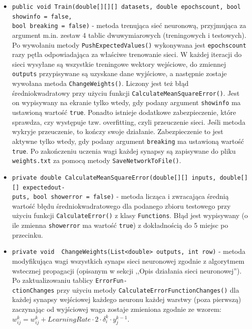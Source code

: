 \documentclass[12pt,a4paper]{article}
\begin{document}
\begin{itemize}
	    \item \lstinline{public void Train(double[][][] datasets, double epochscount, bool showinfo = false,} \\ \lstinline{bool breaking = false)} - metoda trenująca sieć neuronową, przyjmująca za argument m.in. zestaw 4 tablic dwuwymiarowych (treningowych i testowych). Po wywołaniu metody \lstinline{PushExpectedValues()} wykonywana jest \lstinline{epochscount} razy pętla odpowiadająca za właściwe trenowanie sieci. W każdej iteracji do sieci wysyłane są wszystkie treningowe wektory wejściowe, do zmiennej \lstinline{outputs} przypisywane są uzyskane dane wyjściowe, a następnie zostaje wywołana metoda \lstinline{ChangeWeights()}. Liczony jest też błąd średniokwadratowy przy użyciu funkcji \lstinline{CalculateMeanSquareError()}. Jest on wypisywany na ekranie tylko wtedy, gdy podany argument \lstinline{showinfo} ma ustawioną wartość \lstinline{true}. Ponadto istnieje dodatkowe zabezpieczenie, które sprawdza, czy występuje tzw. overfitting, czyli przeuczenie sieci. Jeśli metoda wykryje przeuczenie, to kończy swoje działanie. Zabezpieczenie to jest aktywne tylko wtedy, gdy podany argument \lstinline{breaking} ma ustawioną wartość \lstinline{true}. Po zakończeniu uczenia wagi każdej synapsy są zapisywane do pliku \lstinline{weights.txt} za pomocą metody \lstinline{SaveNetworkToFile()}.
	    \item \lstinline{private double CalculateMeanSquareError(double[][] inputs, double[][] expectedout-} \\ \lstinline{puts, bool showerror = false)} - metoda licząca i zwracająca średnią wartość błędu średniokwadratowego dla podanego zbioru testowego przy użyciu funkcji \lstinline{CalculateError()} z klasy \lstinline{Functions}. Błąd jest wypisywany (o ile zmienna \lstinline{showerror} ma wartość \lstinline{true}) z dokładnością do 5 miejsc po przecinku.
	    \item \lstinline{private void  ChangeWeights(List<double> outputs, int row)} - metoda modyfikująca wagi wszystkich synaps sieci neuronowej zgodnie z algorytmem wstecznej propagacji (opisanym w sekcji ,,Opis działania sieci neuronowej''). Po zaktualizowaniu tablicy \lstinline{ErrorFun-} \\ \lstinline{ctionChanges} przy użyciu metody \lstinline{CalculateErrorFunctionChanges()} dla każdej synapsy wejściowej każdego neuronu każdej warstwy (poza pierwszą) zaczynając od wyjściowej waga zostaje zmieniona zgodnie ze wzorem: $w^k_{ij} = w^k_{ij} + LearningRate \cdot 2 \cdot \delta^k_i \cdot y^{k-1}_j$.

\end{itemize}
\end{document}
